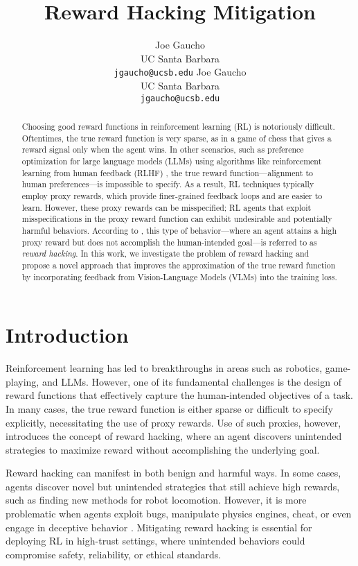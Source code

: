 \documentclass{article}
\title{Reward Hacking Mitigation}
\author{
  Joe Gaucho\\
  UC Santa Barbara\\
  \texttt{jgaucho@ucsb.edu}
  \And
  Joe Gaucho\\
  UC Santa Barbara\\
  \texttt{jgaucho@ucsb.edu}
}
\begin{document}
\maketitle


\begin{abstract} 
  Choosing good reward functions in reinforcement learning (RL) is notoriously difficult. Oftentimes, the true reward function is very sparse, as in a game of chess that gives a reward signal only when the agent wins. In other scenarios, such as preference optimization for large language models (LLMs) using algorithms like reinforcement learning from human feedback (RLHF) \cite{christiano2023deep}, the true reward function—alignment to human preferences—is impossible to specify. As a result, RL techniques typically employ proxy rewards, which provide finer-grained feedback loops and are easier to learn. However, these proxy rewards can be misspecified; RL agents that exploit misspecifications in the proxy reward function can exhibit undesirable and potentially harmful behaviors. According to \cite{skalse2022definingcharacterizingrewardhacking}, this type of behavior—where an agent attains a high proxy reward but does not accomplish the human-intended goal—is referred to as \textit{reward hacking}. In this work, we investigate the problem of reward hacking and propose a novel approach that improves the approximation of the true reward function by incorporating feedback from Vision-Language Models (VLMs) into the training loss.
\end{abstract}

\section{Introduction}

Reinforcement learning has led to breakthroughs in areas such as robotics, game-playing, and LLMs. However, one of its fundamental challenges is the design of reward functions that effectively capture the human-intended objectives of a task. In many cases, the true reward function is either sparse or difficult to specify explicitly, necessitating the use of proxy rewards. Use of such proxies, however, introduces the concept of reward hacking, where an agent discovers unintended strategies to maximize reward without accomplishing the underlying goal.

Reward hacking can manifest in both benign and harmful ways. In some cases, agents discover novel but unintended strategies that still achieve high rewards, such as finding new methods for robot locomotion. However, it is more problematic when agents exploit bugs, manipulate physics engines, cheat, or even engage in deceptive behavior \cite{DBLP:journals/corr/abs-1803-03453}. Mitigating reward hacking is essential for deploying RL in high-trust settings, where unintended behaviors could compromise safety, reliability, or ethical standards.
\end{document}
